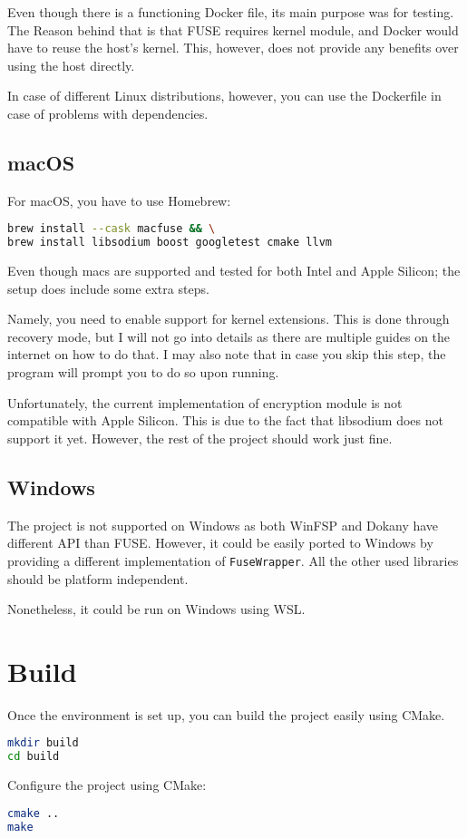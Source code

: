 Even though there is a functioning Docker file, its main purpose was for testing.
The Reason behind that is that FUSE requires kernel module, and Docker would have to reuse the host's kernel.
This, however, does not provide any benefits over using the host directly.

In case of different Linux distributions, however, you can use the Dockerfile in case of problems with dependencies.

\subsection*{macOS}

For macOS, you have to use Homebrew:

\begin{lstlisting}[language=bash, basicstyle=\ttfamily\small]
brew install --cask macfuse && \
brew install libsodium boost googletest cmake llvm
\end{lstlisting}

Even though macs are supported and tested for both Intel and Apple Silicon; the setup does include some extra steps.

Namely, you need to enable support for kernel extensions.
This is done through recovery mode, but I will not go into details as there are multiple guides on the internet on how to do that\cite{macos-kext}.
I may also note that in case you skip this step, the program will prompt you to do so upon running.

Unfortunately, the current implementation of encryption module is not compatible with Apple Silicon.
This is due to the fact that libsodium does not support it yet.
However, the rest of the project should work just fine.

\subsection*{Windows}

The project is not supported on Windows as both WinFSP and Dokany have different API than FUSE\@.
However, it could be easily ported to Windows by providing a different implementation of \texttt{FuseWrapper}.
All the other used libraries should be platform independent.

Nonetheless, it could be run on Windows using WSL\@.

\section{Build}\label{sec:build}

Once the environment is set up, you can build the project easily using CMake.

\begin{lstlisting}[language=bash, basicstyle=\ttfamily\small]
mkdir build
cd build
\end{lstlisting}

\noindent Configure the project using CMake:

\begin{lstlisting}[language=bash, basicstyle=\ttfamily\small]
cmake ..
make
\end{lstlisting}

